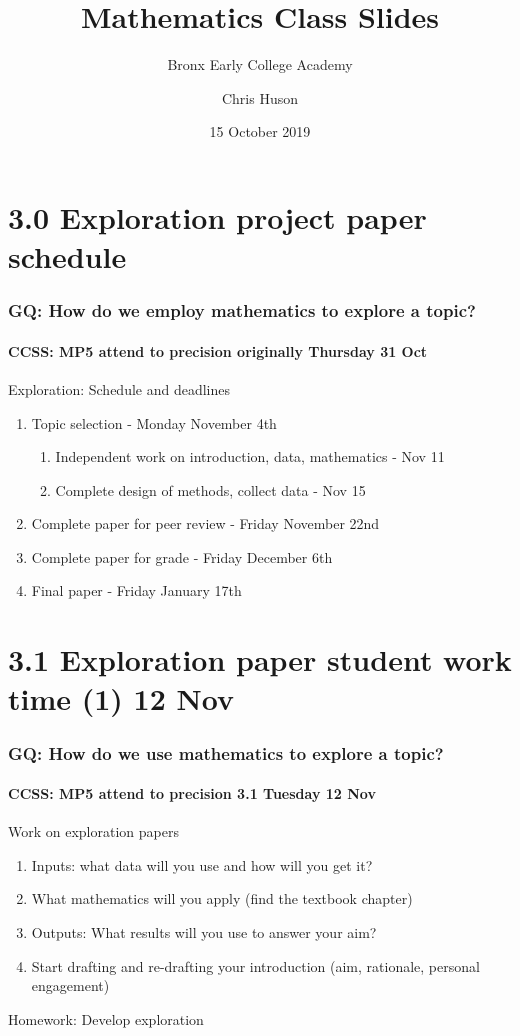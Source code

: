 \documentclass{beamer}
\title{Mathematics Class Slides}
\subtitle{Bronx Early College Academy}
\author{Chris Huson}
\date{15 October 2019}
\begin{document}
\frame{\titlepage}
\section[Outline]{}
\frame{\tableofcontents}

\section{3.0 Exploration project paper schedule}
\frame
{
  \frametitle{GQ: How do we employ mathematics to explore a topic?}
  \framesubtitle{CCSS: MP5 attend to precision \hfill \alert{originally Thursday 31 Oct}}
  \begin{block}{Exploration: Schedule and deadlines}
    \begin{enumerate}
      \item Topic selection - Monday November 4th
      \begin{enumerate}
        \item Independent work on introduction, data, mathematics - Nov 11
        \item Complete design of methods, collect data - Nov 15
      \end{enumerate}
      \item Complete paper for peer review - Friday November 22nd
      \item Complete paper for grade - Friday December 6th
      \item Final paper - Friday January 17th
    \end{enumerate}
    \end{block}
}

\section{3.1 Exploration paper student work time (1) 12 Nov}
\frame
{
  \frametitle{GQ: How do we use mathematics to explore a topic?}
  \framesubtitle{CCSS: MP5 attend to precision \hfill \alert{3.1 Tuesday 12 Nov}}

  \begin{block}{Work on exploration papers}
  \begin{enumerate}
      \item Inputs: what data will you use and how will you get it? 
      \item What mathematics will you apply (find the textbook chapter)
      \item Outputs: What results will you use to answer your aim?
      \item Start drafting and re-drafting your introduction (aim, rationale, personal engagement)
  \end{enumerate}
  \end{block}
  Homework: Develop exploration 
}
\end{document}
